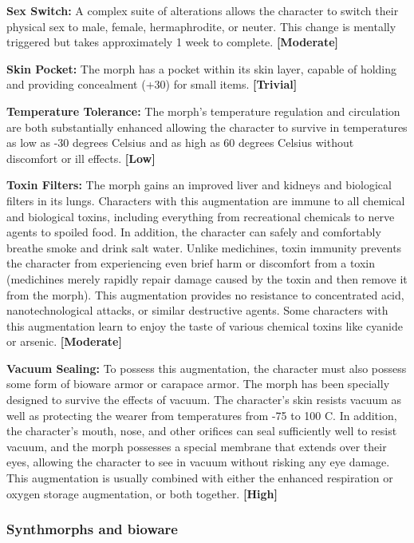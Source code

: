 \textbf{Sex Switch:} A complex suite of alterations allows the character to switch their physical sex to male, female, hermaphrodite, or neuter. This change is mentally triggered but takes approximately 1 week to complete. \textbf{[Moderate]}

\textbf{Skin Pocket:} The morph has a pocket within its skin layer, capable of holding and providing concealment (+30) for small items. \textbf{[Trivial]}

\textbf{Temperature Tolerance:} The morph’s temperature regulation and circulation are both substantially enhanced allowing the character to survive in temperatures as low as -30 degrees Celsius and as high as 60 degrees Celsius without discomfort or ill effects. \textbf{[Low]}

\textbf{Toxin Filters:} The morph gains an improved liver and kidneys and biological filters in its lungs. Characters with this augmentation are immune to all chemical and biological toxins, including everything from recreational chemicals to nerve agents to spoiled food. In addition, the character can safely and comfortably breathe smoke and drink salt water. Unlike medichines, toxin immunity prevents the character from experiencing even brief harm or discomfort from a toxin (medichines merely rapidly repair damage caused by the toxin and then remove it from the morph). This augmentation provides no resistance to concentrated acid, nanotechnological attacks, or similar destructive agents. Some characters with this augmentation learn to enjoy the taste of various chemical toxins like cyanide or arsenic. \textbf{[Moderate]}

\textbf{Vacuum Sealing:} To possess this augmentation, the character must also possess some form of bioware armor or carapace armor. The morph has been specially designed to survive the effects of vacuum. The character’s skin resists vacuum as well as protecting the wearer from temperatures from -75 to 100 C. In addition, the character’s mouth, nose, and other orifices can seal sufficiently well to resist vacuum, and the morph possesses a special membrane that extends over their eyes, allowing the character to see in vacuum without risking any eye damage. This augmentation is usually combined with either the enhanced respiration or oxygen storage augmentation, or both together. \textbf{[High]}

\subsubsection{Synthmorphs and bioware}

